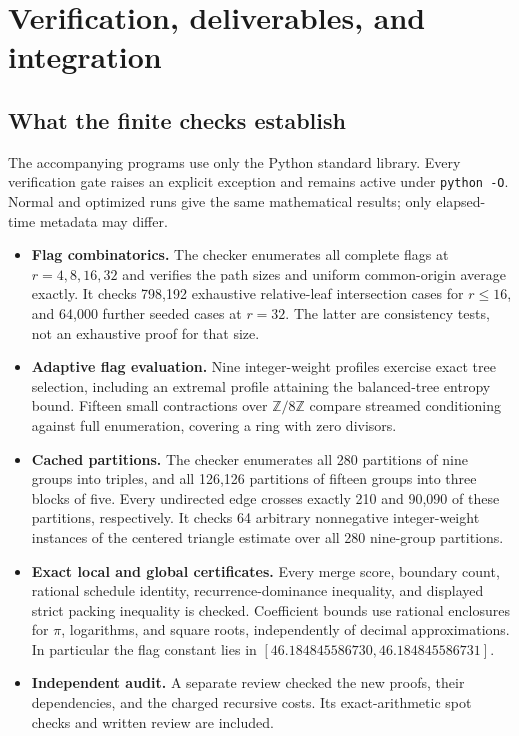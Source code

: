 \section{Verification, deliverables, and integration}
\label{sec:verification}

\subsection{What the finite checks establish}

The accompanying programs use only the Python standard library.
Every verification gate raises an explicit exception and remains active
under \texttt{python -O}. Normal and optimized runs give the same
mathematical results; only elapsed-time metadata may differ.

\begin{itemize}
\item \textbf{Flag combinatorics.} The checker enumerates all complete
flags at $r=4,8,16,32$ and verifies the path sizes and uniform
common-origin average exactly. It checks 798,192 exhaustive
relative-leaf intersection cases for $r\le16$, and 64,000 further
seeded cases at $r=32$. The latter are consistency tests, not an
exhaustive proof for that size.

\item \textbf{Adaptive flag evaluation.} Nine integer-weight profiles
exercise exact tree selection, including an extremal profile attaining
the balanced-tree entropy bound. Fifteen small contractions over
$\mathbb Z/8\mathbb Z$ compare streamed conditioning against full
enumeration, covering a ring with zero divisors.

\item \textbf{Cached partitions.} The checker enumerates all 280
partitions of nine groups into triples, and all 126,126 partitions
of fifteen groups into three blocks of five. Every undirected edge
crosses exactly 210 and 90,090 of these partitions, respectively.
It checks 64 arbitrary nonnegative integer-weight instances of the
centered triangle estimate over all 280 nine-group partitions.

\item \textbf{Exact local and global certificates.} Every merge score,
boundary count, rational schedule identity, recurrence-dominance
inequality, and displayed strict packing inequality is checked.
Coefficient bounds use rational enclosures for $\pi$, logarithms,
and square roots, independently of decimal approximations.
In particular the flag constant lies in
$[46.184845586730,46.184845586731]$.

\item \textbf{Independent audit.} A separate review checked the new
proofs, their dependencies, and the charged recursive costs.
Its exact-arithmetic spot checks and written review are included.
\end{itemize}

